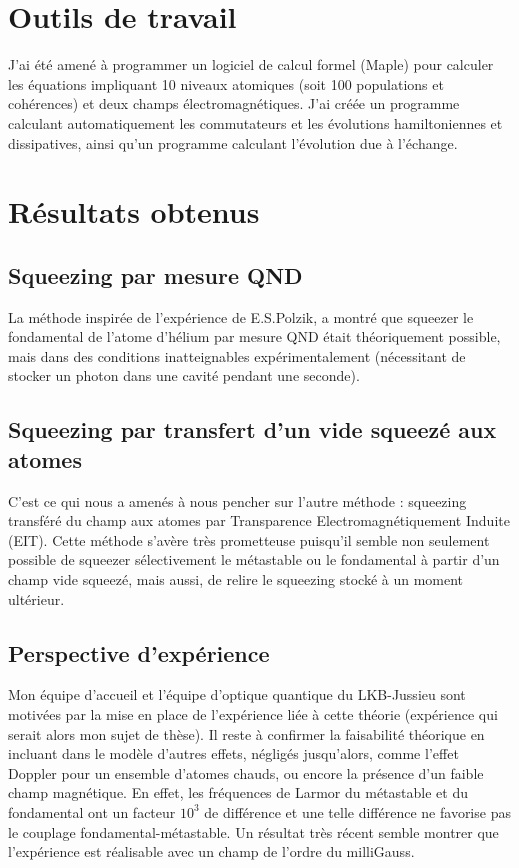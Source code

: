 \documentclass[a4paper,10pt]{article}
\begin{document}
\section{Outils de travail}
J'ai \'{e}t\'{e} amen\'{e} \`{a} programmer un logiciel de calcul formel (Maple) pour calculer
les \'{e}quations impliquant 10 niveaux atomiques (soit 100 populations et
coh\'{e}rences) et deux champs \'{e}lectromagn\'{e}tiques.
J'ai cr\'{e}\'{e}e un programme calculant automatiquement les commutateurs et les
\'{e}volutions hamiltoniennes et dissipatives, ainsi qu'un programme calculant
l'\'{e}volution due \`{a} l'\'{e}change.\\


\section{R\'{e}sultats obtenus}
\subsection{Squeezing par mesure QND}
La m\'{e}thode inspir\'{e}e de l'exp\'{e}rience de E.S.Polzik, a montr\'{e} que squeezer le
fondamental de l'atome d'h\'{e}lium par mesure QND \'{e}tait th\'{e}oriquement possible,
mais dans des conditions inatteignables exp\'{e}rimentalement (n\'ecessitant de stocker un
photon dans une cavit\'{e} pendant une seconde).

\subsection{Squeezing par transfert d'un vide squeez\'{e} aux atomes}
C'est ce qui nous a amen\'{e}s \`{a} nous pencher sur l'autre m\'{e}thode : squeezing
transf\'er\'{e} du champ aux atomes par Transparence Electromagn\'{e}tiquement Induite
(EIT). Cette m\'{e}thode s'av\`{e}re tr\`{e}s prometteuse puisqu'il semble non seulement
possible de squeezer s\'{e}lectivement le m\'{e}tastable ou le fondamental \`{a} partir
d'un champ vide squeez\'{e}, mais aussi, de relire le squeezing stock\'{e} \`{a} un moment
ult\'{e}rieur.\\

\subsection{Perspective d'exp\'{e}rience}
Mon \'equipe d'accueil et l'\'{e}quipe d'optique quantique du LKB-Jussieu sont motiv\'{e}es
par la mise en place de l'exp\'{e}rience li\'{e}e \`{a} cette th\'{e}orie (exp\'{e}rience qui
serait alors mon sujet de th\`{e}se). Il reste \`{a} confirmer la faisabilit\'{e} th\'{e}orique
en incluant dans le mod\`{e}le d'autres effets, n\'{e}glig\'{e}s jusqu'alors,
comme l'effet Doppler pour un ensemble d'atomes chauds, ou encore la
pr\'esence d'un faible champ magn\'etique.
En effet, les fr\'{e}quences
de Larmor du m\'{e}tastable et du fondamental ont un facteur $10^3$ de diff\'{e}rence
et une telle diff\'{e}rence ne favorise pas le couplage fondamental-m\'{e}tastable. Un
r\'{e}sultat tr\`{e}s r\'{e}cent semble montrer que l'exp\'{e}rience est r\'{e}alisable avec un
champ de l'ordre du milliGauss.
\end{document}
